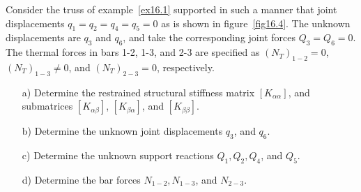 \documentclass{AeroStructure-ERJohnson}
\begin{document}
\begin{example}\label{ex16.2}Consider the truss of example~\ref{ex16.1} supported in such a manner that joint displacements $q_{1}=q_{2}=q_{4}=q_{5}=0$ as is shown in figure~\ref{fig16.4}. The unknown displacements are $q_3$ and $q_6$, and take the corresponding joint forces $Q_{3}=Q_{6}=0$. The thermal forces in bars 1-2, 1-3, and 2-3 are specified as $\left(N_{T}\right)_{1-2}=0$, $\left(N_{T}\right)_{1-3} \neq 0$, and $\left(N_{T}\right)_{2-3}=0$, respectively.



\begin{enumerate}
\item[a)] Determine the restrained structural stiffness matrix $\left[K_{\alpha \alpha}\right]$, and submatrices $\left[K_{\alpha \beta}\right]$, $\left[K_{\beta \alpha}\right]$, and $\left[K_{\beta \beta}\right]$.

\item[b)] Determine the unknown joint displacements $q_{3}$, and $q_{6}$.

\item[c)] Determine the unknown support reactions $Q_{1}, Q_{2}, Q_{4}$, and $Q_{5}$.

\item[d)] Determine the bar forces $N_{1-2}, N_{1-3}$, and $N_{2-3}$.
\end{enumerate}


\end{example}
\end{document}
